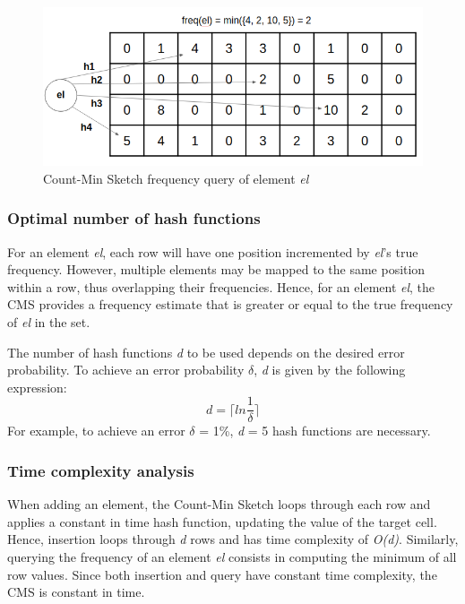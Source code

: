 \begin{figure}[!htb]
    \begin{center}
      \includegraphics[scale=0.5]{figures/query-cms.png}
      \caption[Count-Min Sketch frequency query]{Count-Min Sketch frequency query of element \textit{el}}
      \label{fig:query-cms}
    \end{center}
\end{figure}

\subsubsection*{Optimal number of hash functions} 
For an element \textit{el}, each row will have one position incremented by \textit{el}'s true frequency. However, multiple elements may be mapped to the same position within a row, thus overlapping their frequencies. Hence, for an element \textit{el}, the CMS provides a frequency estimate that is greater or equal to the true frequency of \textit{el} in the set.

The number of hash functions \textit{d} to be used depends on the desired error probability. To achieve an error probability $\delta$, \textit{d} is given by the following expression:
\begin{equation}
    d = \lceil ln \frac{1}{\delta} \rceil
\end{equation}
For example, to achieve an error $\delta$ = 1\%, \textit{d} = 5 hash functions are necessary.

\subsubsection*{Time complexity analysis}
When adding an element, the Count-Min Sketch loops through each row and applies a constant in time hash function, updating the value of the target cell. Hence, insertion loops through \textit{d} rows and has time complexity of \textit{O(d)}. Similarly, querying the frequency of an element \textit{el} consists in computing the minimum of all row values. Since both insertion and query have constant time complexity, the CMS is constant in time.

